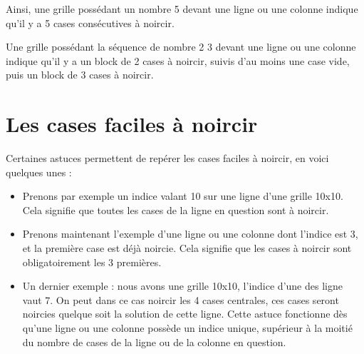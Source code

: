 \documentclass[a4paper, 12pt]{report}
\begin{document}
	        Ainsi, une grille possédant un nombre 5 devant une ligne ou une colonne indique qu'il y a 5 cases consécutives à noircir.
	        
	        Une grille possédant la séquence de nombre 2 3 devant une ligne ou une colonne indique qu'il y a un block de 2 cases à noircir, suivis d'au moins une case vide, puis un block de 3 cases à noircir.
	  
	       

		\section{Les cases faciles à noircir}

            Certaines astuces permettent de repérer les cases faciles à noircir, en voici quelques unes :
            \begin{itemize}
                \item Prenons par exemple un indice valant 10 sur une ligne d'une grille 10x10. Cela signifie que toutes les cases de la ligne en question sont à noircir.
                \item Prenons maintenant l'exemple d'une ligne ou une colonne dont l'indice est 3, et la première case est déjà noircie. Cela signifie que les cases à noircir sont obligatoirement les 3 premières.
                \item Un dernier exemple : nous avons une grille 10x10, l'indice d'une des ligne vaut 7. On peut dans ce cas noircir les 4 cases centrales, ces cases seront noircies quelque soit la solution de cette ligne. Cette astuce fonctionne dès qu'une ligne ou une colonne possède un indice unique, supérieur à la moitié du nombre de cases de la ligne ou de la colonne en question.
            \end{itemize}
\end{document}
